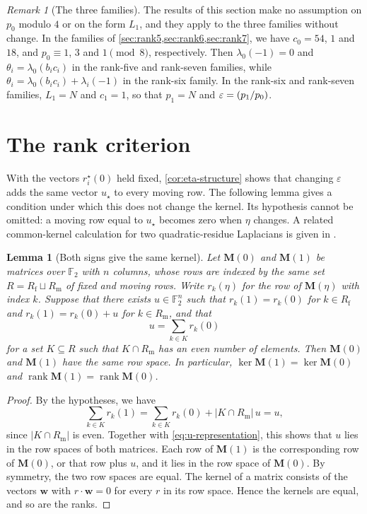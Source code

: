 \documentclass[12pt,oneside,openany]{book}
\theoremstyle{definition}
\theoremstyle{plain}
\numberwithin{equation}{chapter}
\theoremstyle{plain}
\newtheorem{lemma}[lemma]{Lemma}
\theoremstyle{definition}
\theoremstyle{remark}
\newtheorem{remark}[remark]{Remark}
\newcommand{\F}{\mathbb F}
\DeclareMathOperator{\rk}{rank}
\newcommand{\leg}[2]{\mathchoice{\left(\frac{#1}{#2}\right)}{(#1/#2)}{(#1/#2)}{(#1/#2)}}
\newcommand{\eps}{\varepsilon}
\begin{document}
\begin{remark}[The three families]\label{rem:three-families}
The results of this section make no assumption on $p_0$ modulo $4$ or on the form $L_1$, and they apply to the three families without change. In the families of \cref{sec:rank5,sec:rank6,sec:rank7}, we have $c_0=54$, $1$ and $18$, and $p_0\equiv1$, $3$ and $1\pmod8$, respectively. Then $\lambda_0(-1)=0$ and $\theta_i=\lambda_0(b_ic_i)$ in the rank-five and rank-seven families, while $\theta_i=\lambda_0(b_ic_i)+\lambda_i(-1)$ in the rank-six family. In the rank-six and rank-seven families, $L_1=N$ and $c_1=1$, so that $p_1=N$ and $\eps=\leg{p_1}{p_0}$.
\end{remark}

\section{The rank criterion}\label{sec:families-criterion}

With the vectors $r_i^\star(0)$ held fixed, \cref{cor:eta-structure} shows that changing $\eps$ adds the same vector $u_\star$ to every moving row. The following lemma gives a condition under which this does not change the kernel. Its hypothesis cannot be omitted: a moving row equal to $u_\star$ becomes zero when $\eta$ changes. A related common-kernel calculation for two quadratic-residue Laplacians is given in \cite[Lemma~4.2]{Savoie2026}.

\begin{lemma}[Both signs give the same kernel]\label{lem:eta-rank}
Let $\mathbf M(0)$ and $\mathbf M(1)$ be matrices over $\F_2$ with $n$ columns, whose rows are indexed by the same set $R=R_{\mathrm f}\sqcup R_{\mathrm m}$ of fixed and moving rows. Write $r_k(\eta)$ for the row of $\mathbf M(\eta)$ with index $k$. Suppose that there exists $u\in\F_2^n$ such that $r_k(1)=r_k(0)$ for $k\in R_{\mathrm f}$ and $r_k(1)=r_k(0)+u$ for $k\in R_{\mathrm m}$, and that
\begin{equation}\label{eq:u-representation}
u=\sum_{k\in K}r_k(0)
\end{equation}
for a set $K\subseteq R$ such that $K\cap R_{\mathrm m}$ has an even number of elements. Then $\mathbf M(0)$ and $\mathbf M(1)$ have the same row space. In particular, $\ker\mathbf M(1)=\ker\mathbf M(0)$ and $\rk\mathbf M(1)=\rk\mathbf M(0)$.
\end{lemma}

\begin{proof}
By the hypotheses, we have
\begin{equation}
\sum_{k\in K}r_k(1)=\sum_{k\in K}r_k(0)+|K\cap R_{\mathrm m}|\,u=u,
\end{equation}
since $|K\cap R_{\mathrm m}|$ is even. Together with \eqref{eq:u-representation}, this shows that $u$ lies in the row spaces of both matrices. Each row of $\mathbf M(1)$ is the corresponding row of $\mathbf M(0)$, or that row plus $u$, and it lies in the row space of $\mathbf M(0)$. By symmetry, the two row spaces are equal. The kernel of a matrix consists of the vectors $\mathbf w$ with $r\cdot\mathbf w=0$ for every $r$ in its row space. Hence the kernels are equal, and so are the ranks.
\end{proof}
\end{document}
